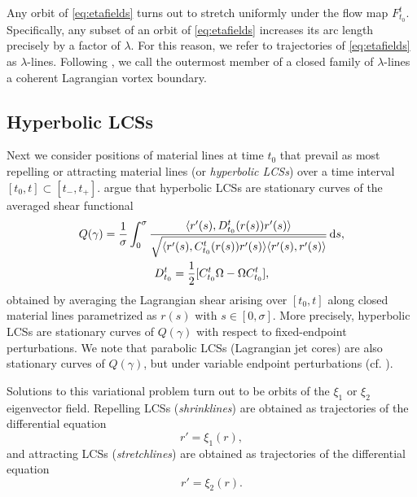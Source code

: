 \documentclass[5p]{elsarticle}
\begin{document}
Any orbit of \cref{eq:etafields} turns out to stretch uniformly under the flow map $F_{t_0}^t$. Specifically, any subset of an orbit of \cref{eq:etafields} increases its arc length precisely by a factor of $\lambda$. For this reason, we refer to trajectories of \cref{eq:etafields} as $\lambda$-lines. Following \citet{haller13:_coher_lagran,haller14:_adden_coher_lagran}, we call the outermost member of a closed family of $\lambda$-lines a coherent Lagrangian vortex boundary.

\subsection{Hyperbolic LCSs}
\label{sec:Hyperbolic LCSs}

Next we consider positions of material lines at time $t_0$ that prevail as most repelling or attracting material lines (or \emph{hyperbolic LCSs}) over a time interval $[t_0,t] \subset [t_-,t_+]$. \citet{farazmand14:_shearless} argue that hyperbolic LCSs are stationary curves of the averaged shear functional
\begin{gather*}
Q(\gamma) = \frac{1}{\sigma} \int_0^\sigma \frac{\langle r'(s),D_{t_0}^t(r(s)) r'(s)\rangle}{\sqrt{\langle r'(s),C_{t_0}^t(r(s)) r'(s)\rangle\langle r'(s),r'(s)\rangle}}\dif s,\\
D_{t_0}^t = \frac12 [C_{t_0}^t \Omega - \Omega C_{t_0}^t],
\end{gather*}
obtained by averaging the Lagrangian shear arising over $[t_0,t]$ along closed material lines parametrized as $r(s)$ with $s \in [0,\sigma]$. More precisely, hyperbolic LCSs are stationary curves of $Q(\gamma)$ with respect to fixed-endpoint perturbations. We note that parabolic LCSs (Lagrangian jet cores) are also stationary curves of $Q(\gamma)$, but under variable endpoint perturbations (cf. \citet{farazmand14:_shearless}).

Solutions to this variational problem turn out to be orbits of the $\xi_1$ or $\xi_2$ eigenvector field. Repelling LCSs (\emph{shrinklines}) are obtained as trajectories of the differential equation
\begin{equation}
r' = \xi_1(r),
\label{eq:shrinkline}
\end{equation}
and attracting LCSs (\emph{stretchlines}) are obtained as trajectories of the differential equation
\begin{equation}
r' = \xi_2(r).
\label{eq:stretchline}
\end{equation}
\end{document}
